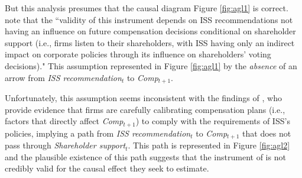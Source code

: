 \documentclass[12pt,reqno,titlepage]{amsart}
\begin{document}
But this analysis presumes that the causal diagram Figure \ref{fig:agl1} is correct.
\citet[p.\,912]{Armstrong:2013io} note that the ``validity of this instrument depends on ISS recommendations not having an influence on future compensation decisions conditional on shareholder support (i.e., firms listen to their shareholders, with ISS having only an indirect impact on corporate policies through its influence on shareholders' voting decisions)."
This assumption represented in Figure \ref{fig:agl1} by the \emph{absence} of an arrow from \textit{ISS recommendation}$_t$ to \textit{Comp}$_{t+1}$.

Unfortunately, this assumption seems inconsistent with the findings of \citet{Gow:2013aa}, who provide evidence that firms are carefully calibrating compensation plans (i.e., factors that directly affect \textit{Comp}$_{t+1}$) to comply with the requirements of ISS's policies, implying a path from \textit{ISS recommendation}$_t$ to \textit{Comp}$_{t+1}$ that does not pass through \textit{Shareholder support}$_{t}$.
This path is represented in Figure \ref{fig:agl2} and the plausible existence of this path suggests that the instrument of \citet[p.\,912]{Armstrong:2013io} is not credibly valid for the causal effect they seek to estimate.
\end{document}
